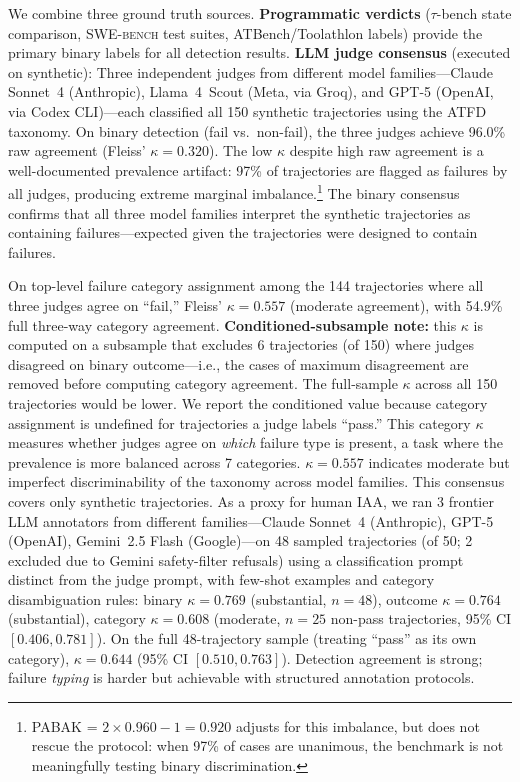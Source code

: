 \documentclass[11pt]{article}
\newcommand{\atfd}{\textsc{ATFD}\xspace}
\newcommand{\taubench}{$\tau$-bench\xspace}
\newcommand{\swebench}{\textsc{SWE-bench}\xspace}
\begin{document}
We combine three ground truth sources.
\textbf{Programmatic verdicts} (\taubench state comparison, \swebench
test suites, ATBench/Toolathlon labels) provide the primary binary labels
for all detection results.
\textbf{LLM judge consensus} (executed on synthetic):
Three independent judges from different model families---Claude Sonnet~4
(Anthropic), Llama~4~Scout (Meta, via Groq), and GPT-5 (OpenAI, via
Codex CLI)---each classified all 150 synthetic trajectories using the
\atfd taxonomy. On binary detection (fail vs.\ non-fail), the three judges
achieve 96.0\% raw agreement (Fleiss' $\kappa = 0.320$). The low $\kappa$
despite high raw agreement is a well-documented prevalence artifact: 97\%
of trajectories are flagged as failures by all judges, producing extreme
marginal imbalance.\footnote{PABAK = $2 \times 0.960 - 1 = 0.920$
\citep{byrt1993bias} adjusts for this imbalance, but does not rescue
the protocol: when 97\% of cases are unanimous, the benchmark is not
meaningfully testing binary discrimination.}
The binary consensus confirms that all three model families interpret the
synthetic trajectories as containing failures---expected given the
trajectories were designed to contain failures.

On top-level failure category assignment among the 144 trajectories where
all three judges agree on ``fail,'' Fleiss' $\kappa = 0.557$ (moderate
agreement), with 54.9\% full three-way category agreement.
\textbf{Conditioned-subsample note:} this $\kappa$ is computed on a
subsample that excludes 6 trajectories (of 150) where judges disagreed
on binary outcome---i.e., the cases of maximum disagreement are removed
before computing category agreement. The full-sample $\kappa$ across all
150 trajectories would be lower. We report the conditioned value because
category assignment is undefined for trajectories a judge labels ``pass.''
This category $\kappa$ measures whether judges agree on \emph{which}
failure type is present, a task where the prevalence is more balanced
across 7 categories. $\kappa = 0.557$ indicates moderate but imperfect
discriminability of the taxonomy across model families.
This consensus covers only synthetic trajectories. As a proxy for human
IAA, we ran 3 frontier LLM annotators from different
families---Claude Sonnet~4 (Anthropic), GPT-5 (OpenAI), Gemini~2.5
Flash (Google)---on 48 sampled trajectories (of 50; 2 excluded due to
Gemini safety-filter refusals) using a classification prompt distinct
from the judge prompt, with few-shot examples and category
disambiguation rules: binary $\kappa = 0.769$ (substantial, $n = 48$),
outcome $\kappa = 0.764$ (substantial), category $\kappa = 0.608$
(moderate, $n = 25$ non-pass trajectories, 95\% CI $[0.406, 0.781]$).
On the full 48-trajectory sample (treating ``pass'' as its own category),
$\kappa = 0.644$ (95\% CI $[0.510, 0.763]$).
Detection agreement is strong; failure \emph{typing} is harder but
achievable with structured annotation protocols.
\end{document}
